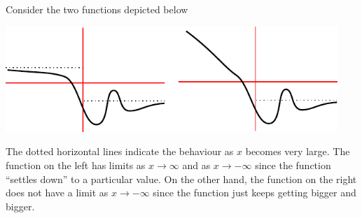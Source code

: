 \begin{eg}
Consider the two functions depicted below
\begin{efig}
\begin{center}
 \includegraphics[height=4cm]{lim7}
\end{center}
\end{efig}
The dotted horizontal lines indicate the behaviour as $x$ becomes very large.
The function on the left has limits as $x \to \infty$ and as $x \to -\infty$
since  the function ``settles down'' to a particular value. On the other hand,
the function  on the right does not have a limit as $x \to -\infty$ since the
function just keeps getting bigger and bigger.
\end{eg}

